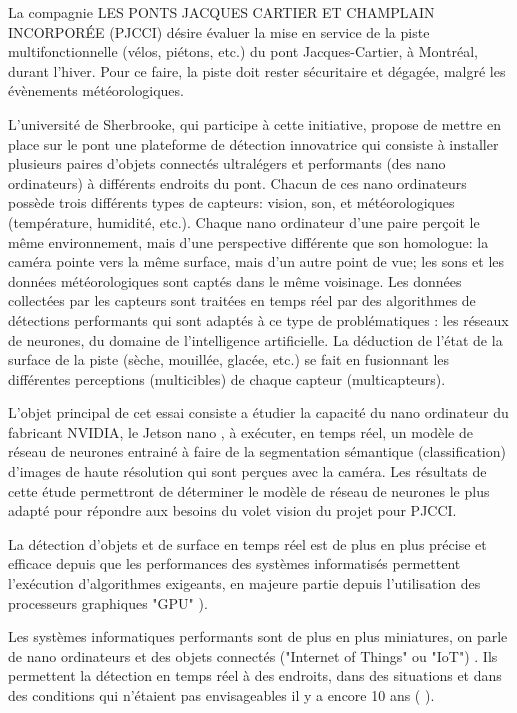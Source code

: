 ﻿\par La compagnie LES PONTS JACQUES CARTIER ET CHAMPLAIN INCORPORÉE (PJCCI) désire évaluer la mise en service de la piste multifonctionnelle (vélos, piétons, etc.) du pont Jacques-Cartier, à Montréal, durant l'hiver. Pour ce faire, la piste doit rester sécuritaire et dégagée, malgré les évènements météorologiques.
\par L'université de Sherbrooke, qui participe à cette initiative, propose de mettre en place sur le pont une plateforme de détection innovatrice qui consiste à installer plusieurs paires d'objets connectés ultralégers et performants (des nano ordinateurs) à différents endroits du pont. Chacun de ces nano ordinateurs possède trois différents types de capteurs: vision, son, et météorologiques (température, humidité, etc.). Chaque nano ordinateur d'une paire perçoit le même environnement, mais d'une perspective différente que son homologue: la caméra pointe vers la même surface, mais d'un autre point de vue; les sons et les données météorologiques sont captés dans le même voisinage. Les données collectées par les capteurs sont traitées en temps réel par des algorithmes de détections performants qui sont adaptés à ce type de problématiques : les réseaux de neurones, du domaine de l'intelligence artificielle. La déduction de l'état de la surface de la piste (sèche, mouillée, glacée, etc.) se fait en fusionnant les différentes perceptions (multicibles) de chaque capteur (multicapteurs).
\par L'objet principal de cet essai consiste a étudier la capacité du nano ordinateur du fabricant NVIDIA, le Jetson nano \cite{nvidia_jetson_2019}, à exécuter, en temps réel, un modèle de réseau de neurones entrainé à faire de la segmentation sémantique (classification) d'images de haute résolution qui sont perçues avec la caméra. Les résultats de cette étude permettront de déterminer le modèle de réseau de neurones le plus adapté pour répondre aux besoins du volet vision du projet pour PJCCI. 
\par La détection d'objets et de surface en temps réel est de plus en plus précise et efficace depuis que les performances des systèmes informatisés permettent l'exécution d'algorithmes exigeants, en majeure partie depuis l'utilisation des processeurs graphiques "GPU" \cite{chong_real-time_1992} \cite{dettmers_deep_2015} \cite{beam_deep_2017} \cite{jiaconda_concise_2019} \cite{jia_real-time_2020} \cite{kurenkov_brief_2015}). 
\par Les systèmes informatiques performants sont de plus en plus miniatures, on parle de nano ordinateurs et des objets connectés ("Internet of Things" ou "IoT") \cite{blanco-filgueira_deep_2019} \cite{sharma_history_2019}. Ils permettent la détection en temps réel à des endroits, dans des situations et dans des conditions qui n'étaient pas envisageables il y a encore 10 ans (\cite{jia_real-time_2020} \cite{bernas_edge_2017} \cite{abouzahir_iot-empowered_2017} \cite{blanco-filgueira_deep_2019}).

